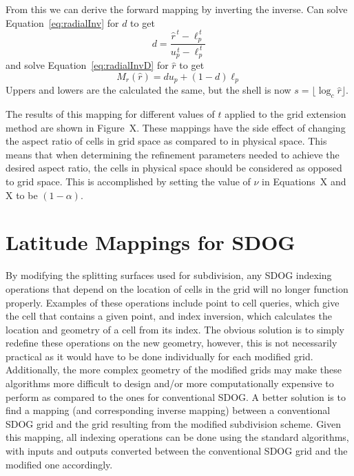 From this we can derive the forward mapping by inverting the inverse.
Can solve Equation~\ref{eq:radialInv} for $d$ to get
%
\begin{equation} \label{radialForwD}
d = \frac{ \hat{r}^{\,t} - \ell_p^{\,t} }{ u_p^{\,t} - \ell_p^{\,t} }
\end{equation}
%
and solve Equation~\ref{eq:radialInvD} for $\hat{r}$ to get
%
\begin{equation} \label{eq:radialForw}
M_r (\hat{r}) = d u_p + \left( 1 - d \right) \ell_p 
\end{equation}
%
Uppers and lowers are the calculated the same, but the shell is now $s = \lfloor \log_{c} \hat{r} \rfloor$.


The results of this mapping for different values of $t$ applied to the grid extension method are shown in Figure~X. These mappings have the side effect of changing the aspect ratio of cells in grid space as compared to in physical space. This means that when determining the refinement parameters needed to achieve the desired aspect ratio, the cells in physical space should be considered as opposed to grid space.
This is accomplished by setting the value of $\nu$ in Equations~X and X to be $(1 - \alpha)$.

\section{Latitude Mappings for SDOG} \label{chap:6:latitude}

By modifying the splitting surfaces used for subdivision, any SDOG indexing operations that depend on the location of cells in the grid will no longer function properly.
Examples of these operations include point to cell queries, which give the cell that contains a given point, and index inversion, which calculates the location and geometry of a cell from its index.
The obvious solution is to simply redefine these operations on the new geometry, however, this is not necessarily practical as it would have to be done individually for each modified grid.
Additionally, the more complex geometry of the modified grids may make these algorithms more difficult to design and/or more computationally expensive to perform as compared to the ones for conventional SDOG.
A better solution is to find a mapping (and corresponding inverse mapping) between a conventional SDOG grid and the grid resulting from the modified subdivision scheme.
Given this mapping, all indexing operations can be done using the standard algorithms, with inputs and outputs converted between the conventional SDOG grid and the modified one accordingly.


